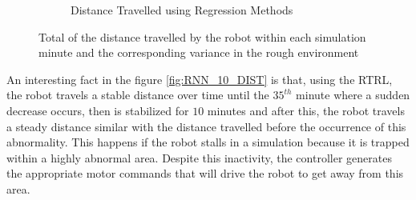 \documentclass[msc,ai,logo]{infthesis}
\begin{document}
\begin{figure}[H]
\begin{subfigure}[b]{0.5\textwidth}
                \caption{Distance Travelled using Regression Methods}
               \label{fig:LR_10_DIST}    
        \end{subfigure}
        \caption{Total of the distance travelled by the robot within each simulation minute and the corresponding variance in the rough environment}
        \label{fig:10_DIST}
\end{figure}

An interesting fact in the figure \ref{fig:RNN_10_DIST} is that, using the RTRL, the robot travels a stable distance over time until the $35^{th}$ minute where a sudden decrease occurs, then is stabilized for $10$ minutes and after this, the robot travels a steady distance similar with the distance travelled before the occurrence of this abnormality.     
This happens if the robot stalls in a simulation because it is trapped within a highly abnormal area. Despite this inactivity, the controller generates the appropriate motor commands that will drive the robot to get away from this area.  
 
\end{document}
